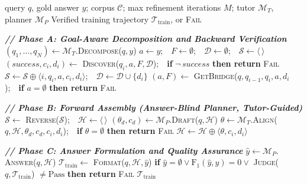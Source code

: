 \documentclass{article} %
\newcommand{\ourmethod}{\texttt{GrepSeek}\xspace}
\begin{document}
\begin{algorithm*}[!t]
\caption{Cold-start Trajectory Generation for \ourmethod{}}
\label{alg:coldstart}
\begin{algorithmic}[1]
\Require query $q$, gold answer $y$; corpus $\mathcal{C}$; max refinement iterations $M$; tutor $\mathcal{M}_{T}$, planner $\mathcal{M}_{P}$
\Ensure  Verified training trajectory $\mathcal{T}_{\mathrm{train}}$, or \textsc{Fail}

\Statex \textbf{\textit{// Phase A: Goal-Aware Decomposition and Backward Verification}}
\State $(q_1,\dots,q_N) \gets \mathcal{M}_{T}.$\textsc{Decompose}($q, y$)  \label{line:decompose}
\State $a \gets y$;\ \ $F \gets \emptyset$;\ \ $\mathcal{D} \gets \emptyset$;\ \ $\mathcal{S} \gets \langle \, \rangle$  \label{line:init_vars}
 \label{line:backward_loop}
    \State $(\textit{success}, c_i, d_i) \gets$ \textsc{Discover}($q_i, a, F, \mathcal{D}$);\ \ \textbf{if} $\neg\,\textit{success}$ \textbf{then return} \textsc{Fail} \label{line:discover}
    \State $\mathcal{S} \gets \mathcal{S} \oplus \langle i, q_i, a, c_i, d_i \rangle$;\ \ $\mathcal{D} \gets \mathcal{D} \cup \{d_i\}$ \label{line:record_step}
     \label{line:if_bridge}
        \State $(a, F) \gets$ \textsc{GetBridge}($q, q_{i-1}, q_i, a, d_i$);\ \ \textbf{if} $a = \emptyset$ \textbf{then return} \textsc{Fail} \label{line:bridge}
    \EndIf
\EndFor

\Statex \textbf{\textit{// Phase B: Forward Assembly (Answer-Blind Planner, Tutor-Guided)}}
\State $\mathcal{S} \gets$ \textsc{Reverse}($\mathcal{S}$);\ \ $\mathcal{H} \gets \langle \, \rangle$  \label{line:reverse_init}
 \label{line:forward_loop}
    \State $(\theta_d, c_d) \gets \mathcal{M}_{P}.$\textsc{Draft}($q, \mathcal{H}$)  \label{line:draft}
    \State $\theta \gets \mathcal{M}_{T}.$\textsc{Align}($q, \mathcal{H}, \theta_d, c_d, c_i, d_i$);\ \ \textbf{if} $\theta = \emptyset$ \textbf{then return} \textsc{Fail} \label{line:align}
    \State $\mathcal{H} \gets \mathcal{H} \oplus \langle \theta, c_i, d_i \rangle$  \label{line:append_h}
\EndFor

\Statex \textbf{\textit{// Phase C: Answer Formulation and Quality Assurance}}
\State $\hat{y} \gets \mathcal{M}_{P}.$\textsc{Answer}($q, \mathcal{H}$) \label{line:answer}
\State $\mathcal{T}_{\mathrm{train}} \gets$ \textsc{Format}($q, \mathcal{H}, \hat{y}$) \label{line:format}
\State \textbf{if} $\hat{y} = \emptyset \lor \mathrm{F_1}(\hat{y}, y) = 0 \lor$ \textsc{Judge}($q, \mathcal{T}_{\mathrm{train}}$) $\neq \mathrm{Pass}$ \textbf{then return} \textsc{Fail} \label{line:judge_gate}
\State \Return $\mathcal{T}_{\mathrm{train}}$ \label{line:return_success}


\end{algorithmic}
\end{algorithm*}
\end{document}
